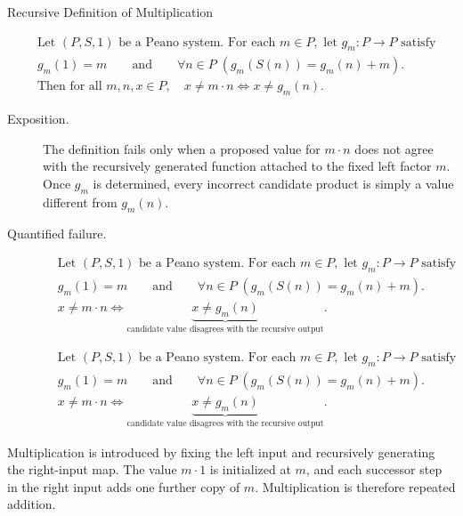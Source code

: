 \begin{topicbox}{Recursive Definition of Multiplication}
\begin{remark*}
\[
\begin{aligned}
&\text{Let } (P,S,1) \text{ be a Peano system. For each } m \in P,
\text{ let } g_m : P \to P \text{ satisfy}\\
&g_m(1)=m
\qquad\text{and}\qquad
\forall n \in P\;(g_m(S(n))=g_m(n)+m).\\
&\text{Then for all } m,n,x \in P,\quad x \neq m \cdot n
\Longleftrightarrow
x \neq g_m(n).
\end{aligned}
\]
\end{remark*}

\begin{remark*}
\begin{description}
  \item[Exposition.]
  The definition fails only when a proposed value for $m \cdot n$ does not
  agree with the recursively generated function attached to the fixed left
  factor $m$. Once $g_m$ is determined, every incorrect candidate product is
  simply a value different from $g_m(n)$.
  \item[Quantified failure.]
  \[
  \begin{aligned}
  &\text{Let } (P,S,1) \text{ be a Peano system. For each } m \in P,
  \text{ let } g_m : P \to P \text{ satisfy}\\
  &g_m(1)=m
  \qquad\text{and}\qquad
  \forall n \in P\;(g_m(S(n))=g_m(n)+m).\\
  &x \neq m \cdot n
  \Longleftrightarrow
  \underbrace{x \neq g_m(n)}_{\text{candidate value disagrees with the recursive output}}.
  \end{aligned}
  \]

\[
  \begin{aligned}
  &\text{Let } (P,S,1) \text{ be a Peano system. For each } m \in P,
  \text{ let } g_m : P \to P \text{ satisfy}\\
  &g_m(1)=m
  \qquad\text{and}\qquad
  \forall n \in P\;(g_m(S(n))=g_m(n)+m).\\
  &x \neq m \cdot n
  \Longleftrightarrow
  \underbrace{x \neq g_m(n)}_{\text{candidate value disagrees with the recursive output}}.
  \end{aligned}
  \]
\end{description}
\end{remark*}

\begin{remark*}[Interpretation]
Multiplication is introduced by fixing the left input and recursively
generating the right-input map. The value $m \cdot 1$ is initialized at $m$,
and each successor step in the right input adds one further copy of $m$.
Multiplication is therefore repeated addition.
\end{remark*}


\end{topicbox}
